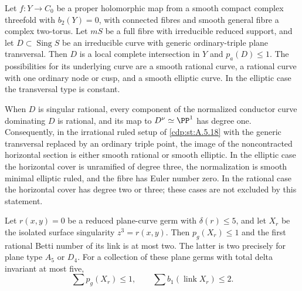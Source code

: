 
\begin{proposition}\hypertarget{tag-01B9}{}\label{cdp:st:A.5.19}


Let $f:Y\to C_0$ be a proper holomorphic map from a smooth
compact complex threefold with $b_2(Y)=0$, with connected
fibres and smooth general fibre a complex two-torus.
Let $mS$ be a full fibre with irreducible reduced support,
and let $D\subset\operatorname{Sing}S$ be an irreducible
curve with generic ordinary-triple plane transversal.
Then $D$ is a local complete intersection in $Y$ and
$p_a(D)\le1$. The possibilities for its underlying curve
are a smooth rational curve, a rational curve with one
ordinary node or cusp, and a smooth elliptic curve.
In the elliptic case the transversal type is constant.

When $D$ is singular rational, every component of the
normalized conductor curve dominating $D$ is rational,
and its map to $D^\nu\simeq\PP^1$ has degree one.
Consequently, in the irrational ruled setup of \ref{cdp:st:A.5.18}
with the generic transversal replaced by an ordinary
triple point, the image of the noncontracted horizontal
section is either smooth rational or smooth elliptic.
In the elliptic case the horizontal cover is unramified
of degree three, the normalization is smooth minimal
elliptic ruled, and the fibre has Euler number zero.
In the rational case the horizontal cover has degree
two or three; these cases are not excluded by this
statement.
\end{proposition}

\begin{proposition}\label{cdp:st:C.2.RAT.6}
Let $r(x,y)=0$ be a reduced plane-curve germ with
$\delta(r)\le5$, and let $X_r$ be the isolated surface
singularity $z^3=r(x,y)$. Then $p_g(X_r)\le1$ and the
first rational Betti number of its link is at most two.
The latter is two precisely for plane type $A_5$ or $D_4$.
For a collection of these plane germs with total delta
invariant at most five,
\[
             \sum p_g(X_r)\le1,
           \qquad \sum b_1(\operatorname{link}X_r)\le2.
\tag{C.RD.5}\label{cdp:eq:C.RD.5}
\]
\end{proposition}

